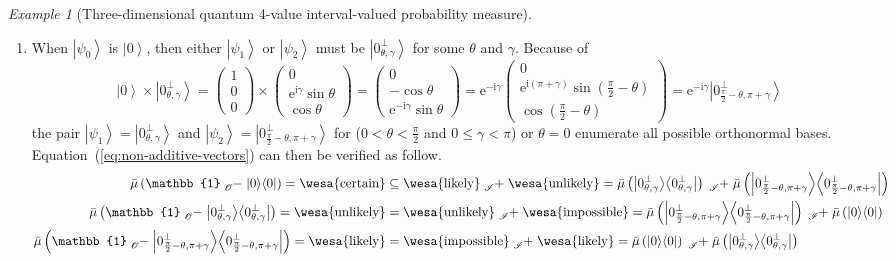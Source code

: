 \documentclass{article}
\theoremstyle{remark}
\newtheorem{example}{Example}
\newcommand{\imposs}{{\mbox{\wesa{impossible}}}}
\newcommand{\likely}{{\mbox{\wesa{likely}}}}
\newcommand{\unlikely}{{\mbox{\wesa{unlikely}}}}
\newcommand{\necess}{{\mbox{\wesa{certain}}}}
\newcommand{\ket}[1]{{\left\vert{#1}\right\rangle}}
\newcommand{\op}[2]{\ensuremath{\left\vert{#1}\middle\rangle\middle\langle{#2}\right\vert}}
\newcommand{\proj}[1]{\op{#1}{#1}}
\newcommand{\rme}{\mathrm{e}}
\newcommand{\rmi}{\mathrm{i}}
\begin{document}
\begin{example}[Three-dimensional quantum 4-value interval-valued
probability measure]
\begin{enumerate}
\item When $\ket{\psi_{0}}$ is $\ket{0}$, then either $\ket{\psi_{1}}$
or $\ket{\psi_{2}}$ must be $\ket{0_{\theta,\gamma}^{\perp}}$ for
some $\theta$ and $\gamma$. Because of 
\[
\ket{0}\times\ket{0_{\theta,\gamma}^{\perp}}=\begin{pmatrix}1\\
0\\
0
\end{pmatrix}\times\begin{pmatrix}0\\
\rme^{\rmi\gamma}\sin\theta\\
\cos\theta
\end{pmatrix}=\begin{pmatrix}0\\
-\cos\theta\\
\rme^{-\rmi\gamma}\sin\theta
\end{pmatrix}=\rme^{-\rmi\gamma}\begin{pmatrix}0\\
\rme^{\rmi\left(\pi+\gamma\right)}\sin\left(\frac{\pi}{2}-\theta\right)\\
\cos\left(\frac{\pi}{2}-\theta\right)
\end{pmatrix}=\rme^{-\rmi\gamma}\ket{0_{\frac{\pi}{2}-\theta,\pi+\gamma}^{\perp}}
\]
the pair $\ket{\psi_{1}}=\ket{0_{\theta,\gamma}^{\perp}}$ and $\ket{\psi_{2}}=\ket{0_{\frac{\pi}{2}-\theta,\pi+\gamma}^{\perp}}$
for ($0<\theta<\frac{\pi}{2}$ and $0\le\gamma<\pi$) or $\theta=0$
enumerate all possible orthonormal bases. Equation~(\ref{eq:non-additive-vectors})
can then be verified as follow. 
\begin{equation}
\begin{aligned}\bar{\mu}\left(\mathbb{1}\tensor*[_{\mathscr{O}}]{-}{}\proj{0}\right)=\necess & \subseteq\likely\tensor*[_{\mathscr{I}}]{+}{}\unlikely=\bar{\mu}\left(\proj{0_{\theta,\gamma}^{\perp}}\right)\tensor*[_{\mathscr{I}}]{+}{}\bar{\mu}\left(\proj{0_{\frac{\pi}{2}-\theta,\pi+\gamma}^{\perp}}\right)\\
\bar{\mu}\left(\mathbb{1}\tensor*[_{\mathscr{O}}]{-}{}\proj{0_{\theta,\gamma}^{\perp}}\right)=\unlikely & =\unlikely\tensor*[_{\mathscr{I}}]{+}{}\imposs=\bar{\mu}\left(\proj{0_{\frac{\pi}{2}-\theta,\pi+\gamma}^{\perp}}\right)\tensor*[_{\mathscr{I}}]{+}{}\bar{\mu}\left(\proj{0}\right)\\
\bar{\mu}\left(\mathbb{1}\tensor*[_{\mathscr{O}}]{-}{}\proj{0_{\frac{\pi}{2}-\theta,\pi+\gamma}^{\perp}}\right)=\likely & =\imposs\tensor*[_{\mathscr{I}}]{+}{}\likely=\bar{\mu}\left(\proj{0}\right)\tensor*[_{\mathscr{I}}]{+}{}\bar{\mu}\left(\proj{0_{\theta,\gamma}^{\perp}}\right)

\end{aligned}
\end{equation}
\end{enumerate}
\end{example}
\end{document}
